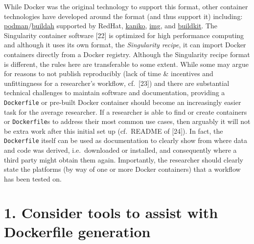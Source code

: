 \documentclass[10pt,letterpaper]{article}
\begin{document}
While Docker was the original technology to support this format, other
container technologies have developed around the format (and thus
support it) including:
\href{https://podman.io/}{podman}/\href{https://github.com/containers/buildah}{buildah}
supported by RedHat,
\href{https://github.com/GoogleContainerTools/kaniko}{kaniko},
\href{https://github.com/genuinetools/img}{img}, and
\href{https://github.com/moby/buildkit}{buildkit}. The Singularity
container software {[}22{]} is optimized for high performance computing
and although it uses its own format, the \emph{Singularity recipe}, it
can import Docker containers directly from a Docker registry. Although
the Singularity recipe format is different, the rules here are
transferable to some extent. While some may argue for reasons to not
publish reproducibly (lack of time \& incentives and unfittingness for a
researcher's workflow, cf.~{[}23{]}) and there are substantial technical
challenges to maintain software and documentation, providing a
\texttt{Dockerfile} or pre-built Docker container should become an
increasingly easier task for the average researcher. If a researcher is
able to find or create containers or \texttt{Dockerfile}s to address
their most common use cases, then arguably it will not be extra work
after this initial set up (cf.~README of {[}24{]}). In fact, the
\texttt{Dockerfile} itself can be used as documentation to clearly show
from where data and code was derived, i.e.~downloaded or installed, and
consequently where a third party might obtain them again. Importantly,
the researcher should clearly state the platforms (by way of one or more
Docker containers) that a workflow has been tested on.

\hypertarget{consider-tools-to-assist-with-dockerfile-generation}{%
\section*{1. Consider tools to assist with Dockerfile
generation}\label{consider-tools-to-assist-with-dockerfile-generation}}
\end{document}
